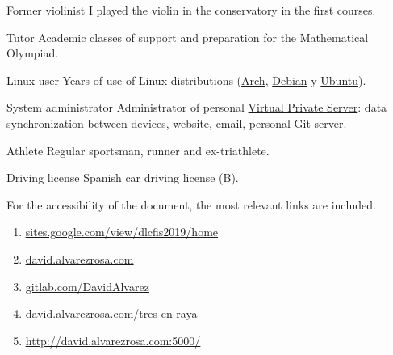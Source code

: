 

\cvachievement{\faMusic}
{Former violinist \smallskip}
{\small {}%
  \small{}}
I played the violin in the conservatory in the first courses.

\divider

\cvachievement{\faGroup}
{Tutor \smallskip}
{Academic classes of support and preparation for the Mathematical Olympiad.}

\divider

\cvachievement{\faLinux}
{Linux user \smallskip}
{Years of use of Linux distributions (\href{https://www.archlinux.org/}{Arch},
\href{https://www.debian.org/}{Debian} y \href{https://ubuntu.com/}{Ubuntu}).}

\divider

\cvachievement{\faServer}
{System administrator}
{Administrator of personal
\href{https://en.wikipedia.org/wiki/Virtual_private_server}{Virtual Private
Server}: data synchronization between devices,
\href{https://david.alvarezrosa.com}{website\footnotemark}, email, personal
\href{https://en.wikipedia.org/wiki/Git}{Git} server.}

\divider

\cvachievement{\faHeartbeat}
{Athlete \smallskip}
{Regular sportsman, runner and ex-triathlete.}

\divider

\cvachievement{\faCar}
{Driving license \smallskip}
{\small {}%
  \small{}}
Spanish car driving license (B).


\medskip

For the accessibility of the document, the most relevant links are included. \\[1.25ex]
\begin{enumerate}
  \item \href{https://sites.google.com/view/dlcfis2019/home}
  {\underline{sites.google.com/view/dlcfis2019/home}}
  \item \href{https://david.alvarezrosa.com}{\underline{david.alvarezrosa.com}}
  \item \href{https://gitlab.com/DavidAlvarez}
  {\underline{gitlab.com/DavidAlvarez}}
  \item \href{https://david.alvarezrosa.com/tres-en-raya}
  {\underline{david.alvarezrosa.com/tres-en-raya}}
  \item \href{http://david.alvarezrosa.com:5000/}
  {\underline{http://david.alvarezrosa.com:5000/}}
\end{enumerate}
